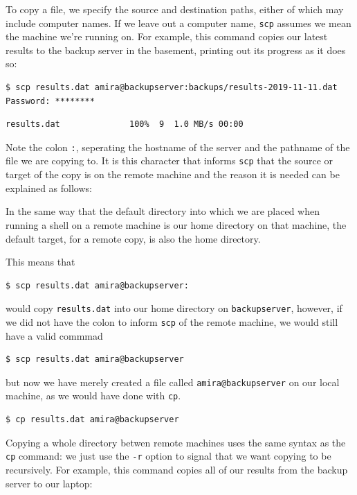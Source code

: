 \documentclass[
]{krantz}
\begin{document}
To copy a file,
we specify the source and destination paths,
either of which may include computer names.
If we leave out a computer name,
\texttt{scp} assumes we mean the machine we're running on.
For example,
this command copies our latest results to the backup server in the basement,
printing out its progress as it does so:

\begin{verbatim}
$ scp results.dat amira@backupserver:backups/results-2019-11-11.dat
Password: ********
\end{verbatim}

\begin{verbatim}
results.dat              100%  9  1.0 MB/s 00:00
\end{verbatim}

Note the colon \texttt{:}, seperating the hostname of the server and the pathname of
the file we are copying to.
It is this character that informs \texttt{scp} that the source or target of the copy is
on the remote machine and the reason it is needed can be explained as follows:

In the same way that the default directory into which we are placed when running
a shell on a remote machine is our home directory on that machine, the default
target, for a remote copy, is also the home directory.

This means that

\begin{verbatim}
$ scp results.dat amira@backupserver:
\end{verbatim}

would copy \texttt{results.dat} into our home directory on \texttt{backupserver}, however, if we did not
have the colon to inform \texttt{scp} of the remote machine, we would still have a valid commmad

\begin{verbatim}
$ scp results.dat amira@backupserver
\end{verbatim}

but now we have merely created a file called \texttt{amira@backupserver} on our local machine,
as we would have done with \texttt{cp}.

\begin{verbatim}
$ cp results.dat amira@backupserver
\end{verbatim}

Copying a whole directory betwen remote machines uses the same syntax as the \texttt{cp} command:
we just use the \texttt{-r} option to signal that we want copying to be recursively.
For example,
this command copies all of our results from the backup server to our laptop:
\end{document}

